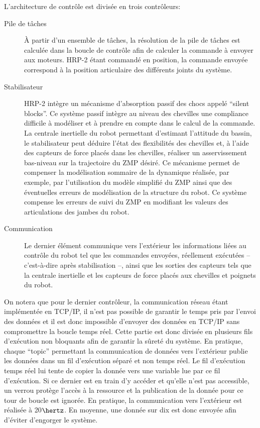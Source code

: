L'architecture de contrôle est divisée en trois contrôleurs:
\begin{description}
\item[Pile de tâches] À partir d'un ensemble de
  tâches, la résolution de la pile de tâches est calculée dans la
  boucle de contrôle afin de calculer la commande à envoyer aux
  moteurs. HRP-2 étant commandé en position, la commande envoyée
  correspond à la position articulaire des différents joints du
  système.
\item[Stabilisateur] HRP-2 intègre un mécanisme
  d'absorption passif des chocs appelé ``silent blocks''. Ce système passif intègre au niveau des chevilles une
  compliance difficile à modéliser et à prendre en compte dans le
  calcul de la commande. La centrale inertielle du robot permettant
  d'estimant l'attitude du bassin, le stabilisateur peut déduire
  l'état des flexibilités des chevilles et, à l'aide des capteurs de
  force placés dans les chevilles, réaliser un asservissement
  bas-niveau sur la trajectoire du ZMP désiré. Ce mécanisme permet de
  compenser la modélisation sommaire de la dynamique réalisée, par
  exemple, par l'utilisation du modèle simplifié du ZMP ainsi que des
  éventuelles erreurs de modélisation de la structure du robot. Ce
  système compense les erreurs de suivi du ZMP en modifiant les
  valeurs des articulations des jambes du robot.
\item[Communication] Le dernier élément communique vers l'extérieur
  les informations liées au contrôle du robot tel que les commandes
  envoyées, réellement exécutées -- c'est-à-dire après stabilisation
  --, ainsi que les sorties des capteurs tels que la centrale
  inertielle et les capteurs de force placés aux chevilles et poignets
  du robot.
\end{description}


On notera que pour le dernier contrôleur, la communication réseau
étant implémentée en TCP/IP, il n'est pas possible de
garantir le temps pris par l'envoi des données et il est donc
impossible d'envoyer des données en TCP/IP sans
compromettre la boucle temps réel. Cette partie est donc divisée en
plusieurs fils d'exécution non bloquants afin de garantir la sûreté du
système. En pratique, chaque ``topic'' permettant la communication de
données vers l'extérieur publie les données dans un fil d'exécution
séparé et non temps réel. Le fil d'exécution
temps réel lui tente de copier la donnée vers une variable lue par ce
fil d'exécution. Si ce dernier est en train d'y accéder et qu'elle
n'est pas accessible, un verrou protège l'accès à la ressource et la
publication de la donnée pour ce tour de boucle est ignorée. En
pratique, la communication vers l'extérieur est réalisée à 20$\hertz$. En
moyenne, une donnée sur dix est donc envoyée afin d'éviter d'engorger
le système.


